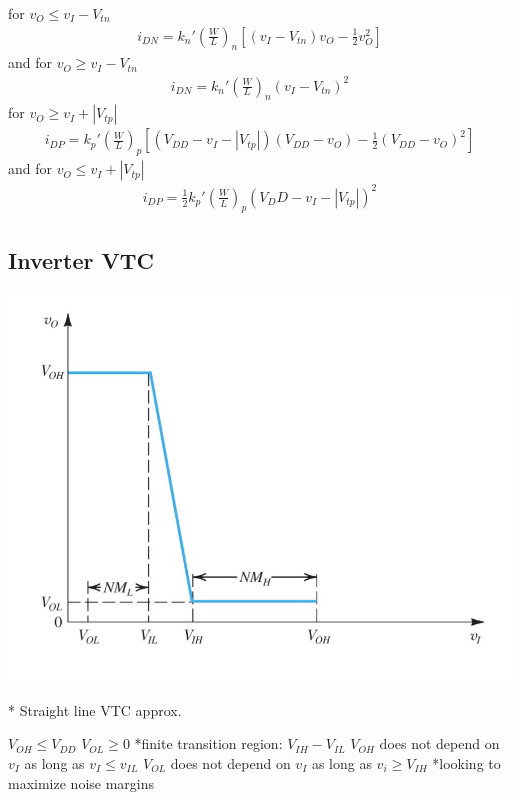 \documentclass[12pt]{article}
\begin{document}
    for $v_O \leq v_I - V_{tn}$
    \begin{align}
        i_{DN} = k_n'\left(\frac{W}{L}\right)_n\left[(v_I - V_{tn})v_O-\frac{1}{2}v_O^2\right]
    \end{align}
    and for $v_O \geq v_I - V_{tn}$
    \begin{align}
        i_{DN} = k_n'\left(\frac{W}{L}\right)_n(v_I - V_{tn})^2
    \end{align}
    for $v_O \geq v_I +|V_{tp}|$
    \begin{align}
        i_{DP} = k_p'\left(\frac{W}{L}\right)_p\left[(V_{DD}-v_I-|V_{tp}|)(V_{DD}-v_O)-\frac{1}{2}(V_{DD}-v_O)^2\right]
    \end{align}
    and for $v_O \leq v_I +|V_{tp}|$
    \begin{align}
        i_{DP} = \frac{1}{2}k_p'\left(\frac{W}{L}\right)_p(V_DD-v_I-|V_{tp}|)^2
    \end{align}

    \subsection*{Inverter VTC}

    \begin{center}
        \centerline{\includegraphics[scale=0.6]{figures/s3.png}}
    \end{center}
    
    * Straight line VTC approx.

    $V_{OH} \leq V_{DD}$
    $V_{OL} \geq 0$
    *finite transition region: $V_{IH} - V_{IL}$
    $V_{OH}$ does not depend on $v_I$ as long as $v_I \leq v_{IL}$
    $V_{OL}$ does not depend on $v_I$ as long as $v_i \geq V_{IH}$
    *looking to maximize noise margins
\end{document}
